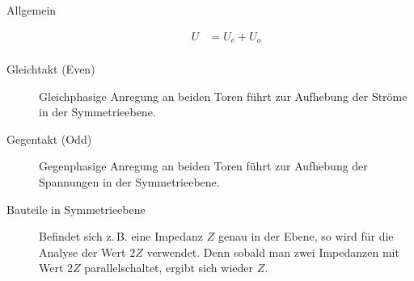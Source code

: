 
\begin{description}
\item[Allgemein]
\begin{align*}
U &= U_e + U_o \\
\end{align*}

\item[Gleichtakt (Even)] Gleichphasige Anregung an beiden Toren führt zur Aufhebung der Ströme in der Symmetrieebene.
\begin{center}
\begin{circuitikz}[scale=1, every node/.style={scale=1}]

\end{circuitikz}
\end{center}

\item[Gegentakt (Odd)] Gegenphasige Anregung an beiden Toren führt zur Aufhebung der Spannungen in der Symmetrieebene.
\begin{center}
\begin{circuitikz}[scale=1, every node/.style={scale=1}]

\end{circuitikz}
\end{center}

\item[Bauteile in Symmetrieebene] Befindet sich z.\,B. eine Impedanz $Z$ genau in der Ebene, so wird für die Analyse der Wert $2Z$ verwendet. Denn sobald man zwei Impedanzen mit Wert $2Z$ parallelschaltet, ergibt sich wieder $Z$.
\end{description}